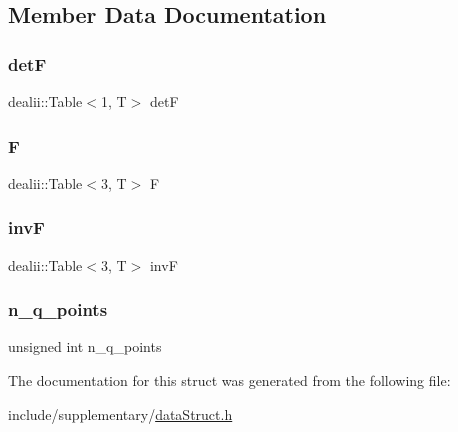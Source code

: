 \subsection{Member Data Documentation}
\mbox{\label{structdeformation_map_aa1ff2dc8fb6f4f6e9125ca026505a977}} 
\subsubsection{\texorpdfstring{detF}{detF}}
{\footnotesize\ttfamily dealii\+::\+Table$<$1, T$>$ detF}

\mbox{\label{structdeformation_map_a7934bed7ba72b5e4a3af1fd8a4e14198}} 
\subsubsection{\texorpdfstring{F}{F}}
{\footnotesize\ttfamily dealii\+::\+Table$<$3, T$>$ F}

\mbox{\label{structdeformation_map_ae40deb9e4616ec6d0b77519e56646ce0}} 
\subsubsection{\texorpdfstring{invF}{invF}}
{\footnotesize\ttfamily dealii\+::\+Table$<$3, T$>$ invF}

\mbox{\label{structdeformation_map_a75df8197cf561419d8ead67373abeafd}} 
\subsubsection{\texorpdfstring{n\+\_\+q\+\_\+points}{n\_q\_points}}
{\footnotesize\ttfamily unsigned int n\+\_\+q\+\_\+points}



The documentation for this struct was generated from the following file\+:\begin{DoxyCompactItemize}
\item 
include/supplementary/\mbox{\hyperlink{data_struct_8h}{data\+Struct.\+h}}\end{DoxyCompactItemize}
